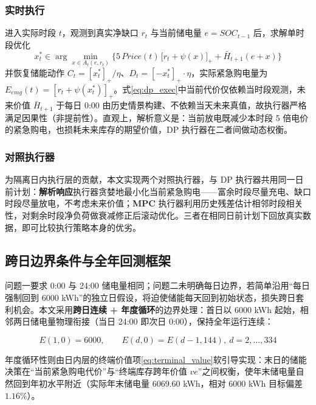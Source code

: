 \documentclass[zihao=-4,a4paper,UTF8,fontset=none]{ctexart}
\begin{document}
\subsubsection{实时执行}

进入实际时段 $t$，观测到真实净缺口 $r_t$ 与当前储电量 $e=SOC_{t-1}$ 后，求解单时段优化
\begin{equation}
  x_t^{*} \in \arg\min_{x\in A_t(e,r_t)}\Big\{
    5\,Price(t)\,\big[r_t+\psi(x)\big]_{+} + \bar{H}_{t+1}(e+x)\Big\}
  \label{eq:dp_exec}
\end{equation}
并恢复储能动作 $C_t=[x_t^{*}]_{+}/\eta$、$D_t=[-x_t^{*}]_{+}\cdot\eta$，实际紧急购电量为 $E_{emg}(t)=[r_t+\psi(x_t^{*})]_{+}$。式\eqref{eq:dp_exec}中当前代价仅依赖当时段观测，未来价值 $\bar{H}_{t+1}$ 于每日 0:00 由历史情景构建、不依赖当天未来真值，故执行器严格满足因果性（非提前性）。直观上，解析意义是：当前放电既减少本时段 5 倍电价的紧急购电，也损耗未来库存的期望价值，DP 执行器在二者间做动态权衡。

\subsubsection{对照执行器}

为隔离日内执行层的贡献，本文实现两个对照执行器，与 DP 执行器共用同一日前计划：\textbf{解析响应}执行器贪婪地最小化当前紧急购电——富余时段尽量充电、缺口时段尽量放电，不考虑未来价值；\textbf{MPC} 执行器利用历史残差估计相邻时段相关性，对剩余时段净负荷做衰减修正后滚动优化。三者在相同日前计划下回放真实数据，即可比较执行策略本身的优劣。

\subsection{跨日边界条件与全年回测框架}

问题一要求 0:00 与 24:00 储电量相同；问题二未明确每日边界，若简单沿用“每日强制回到 6000 kWh”的独立日假设，将迫使储能每天回到初始状态，损失跨日套利机会。本文采用\textbf{跨日连续 + 年度循环}的边界处理：首日以 6000 kWh 起始，相邻两日储电量物理衔接（当日 24:00 即次日 0:00），保持全年运行连续：

\begin{equation}
  E(1,0) = 6000,\qquad
  E(d,0) = E(d-1,144),\ d=2,\ldots,334
  \label{eq:year_boundary}
\end{equation}

年度循环性则由日内层的终端价值项\eqref{eq:terminal_value}软引导实现：末日的储能决策在“当前紧急购电代价”与“终端库存跨年价值 $v e$”之间权衡，使年末储电量自然回到年初水平附近（实际年末储电量 6069.60 kWh，相对 6000 kWh 目标偏差 $1.16\%$）。
\end{document}
